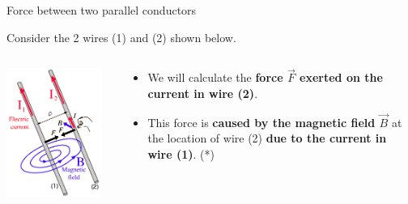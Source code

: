 %
%
%

\begin{frame}{Force between two parallel conductors}

Consider the 2 wires (1) and (2) shown below.\\
\vspace{0.2cm}

\begin{columns}
  \begin{column}{0.40\textwidth}
    \includegraphics[width=0.90\textwidth]{./images/schematics/magnetic_force_between_wires_rho.png}\\
  \end{column}
  \begin{column}{0.60\textwidth}
     \begin{itemize}
       \item We will calculate the {\bf force $\vec{F}$ exerted on the current in wire (2)}.
       \item This force is {\bf caused by the magnetic field $\vec{B}$} at the location of wire (2)
                 {\bf due to the current in wire (1)}. (*)

\end{itemize}
\end{column}
\end{columns}
\end{frame}
